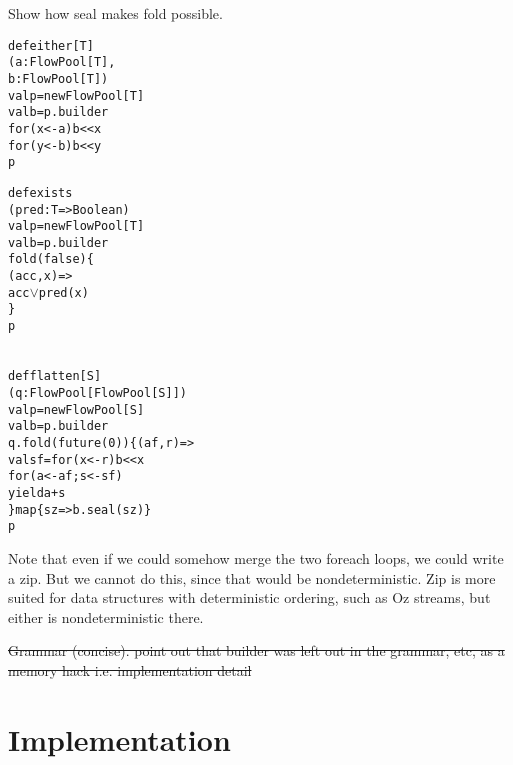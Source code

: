 \documentclass[runningheads,a4paper]{llncs}
\begin{document}
Show how seal makes fold possible.

\begin{minipage}[b]{3.4 cm}
\begin{alltt}
{\scriptsize
def either[T]
  (a: FlowPool[T],
   b: FlowPool[T])
  val p = new FlowPool[T]
  val b = p.builder
  for (x <- a) b << x
  for (y <- b) b << y
  p


}
\end{alltt}
\end{minipage}
\begin{minipage}[b]{3.9 cm}
\begin{alltt}
{\scriptsize
def exists
  (pred: T => Boolean)
  val p = new FlowPool[T]
  val b = p.builder
  fold(false) \{
    (acc, x) =>
    acc \(\vee\) pred(x)
  \}
  p

}
\end{alltt}
\end{minipage}
\begin{minipage}[b]{4.7 cm}
\begin{alltt}
{\scriptsize
def flatten[S]
  (q: FlowPool[FlowPool[S]])
  val p = new FlowPool[S]
  val b = p.builder
  q.fold(future(0)) \{ (af, r) =>
    val sf = for (x <- r) b << x
    for (a <- af; s <- sf)
      yield a + s
  \} map \{ sz => b.seal(sz) \}
  p
}
\end{alltt}
\end{minipage}

Note that even if we could somehow merge the two foreach loops, we
could write a zip. But we cannot do this, since that would be
nondeterministic.
Zip is more suited for data structures with deterministic ordering,
such as Oz streams, but either is nondeterministic there.

\sout {Grammar (concise). point out that builder was left out in the grammar,
etc, as a memory hack i.e. implementation detail}

\section{Implementation}
\end{document}
